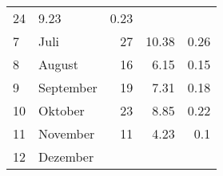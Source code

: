 \begin{longtable}{lXrrr}
       \num{24} &
       \num[round-mode=places,round-precision=2]{9.23} &
         \num[round-mode=places,round-precision=2]{0.23} \\

     7 &
     \multicolumn{1}{X}{ Juli   } &


       \num{27} &
       \num[round-mode=places,round-precision=2]{10.38} &
         \num[round-mode=places,round-precision=2]{0.26} \\

     8 &
     \multicolumn{1}{X}{ August   } &


       \num{16} &
       \num[round-mode=places,round-precision=2]{6.15} &
         \num[round-mode=places,round-precision=2]{0.15} \\

     9 &
     \multicolumn{1}{X}{ September   } &


       \num{19} &
       \num[round-mode=places,round-precision=2]{7.31} &
         \num[round-mode=places,round-precision=2]{0.18} \\

     10 &
     \multicolumn{1}{X}{ Oktober   } &


       \num{23} &
       \num[round-mode=places,round-precision=2]{8.85} &
         \num[round-mode=places,round-precision=2]{0.22} \\

     11 &
     \multicolumn{1}{X}{ November   } &


       \num{11} &
       \num[round-mode=places,round-precision=2]{4.23} &
         \num[round-mode=places,round-precision=2]{0.1} \\

     12 &
     \multicolumn{1}{X}{ Dezember   } &



\end{longtable}
